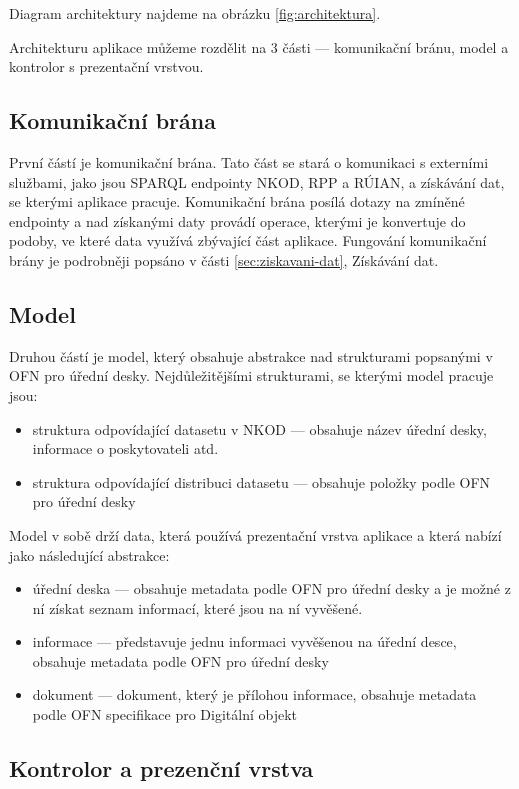 Diagram architektury najdeme na obrázku \ref{fig:architektura}.

Architekturu aplikace můžeme rozdělit na 3 části --- komunikační bránu, model a kontrolor s prezentační vrstvou.

\subsection{Komunikační brána}

První částí je komunikační brána. Tato část se stará o komunikaci s externími službami, jako jsou SPARQL endpointy NKOD, RPP a RÚIAN, a získávání dat, se kterými aplikace pracuje. Komunikační brána posílá dotazy na zmíněné endpointy a nad získanými daty provádí operace, kterými je konvertuje do podoby, ve které data využívá zbývající část aplikace. Fungování komunikační brány je podrobněji popsáno v části \ref{sec:ziskavani-dat}, Získávání dat.

\subsection{Model}

Druhou částí je model, který obsahuje abstrakce nad strukturami popsanými v OFN pro úřední desky. Nejdůležitějšími strukturami, se kterými model pracuje jsou:
\begin{itemize}
    \item struktura odpovídající datasetu v NKOD --- obsahuje název úřední desky, informace o poskytovateli atd.
    \item struktura odpovídající distribuci datasetu --- obsahuje položky podle OFN pro úřední desky
\end{itemize}

Model v sobě drží data, která používá prezentační vrstva aplikace a která nabízí jako následující abstrakce:
\begin{itemize}
    \item úřední deska --- obsahuje metadata podle OFN pro úřední desky a je možné z ní získat seznam informací, které jsou na ní vyvěšené.
    \item informace --- představuje jednu informaci vyvěšenou na úřední desce, obsahuje metadata podle OFN pro úřední desky
    \item dokument --- dokument, který je přílohou informace, obsahuje metadata podle OFN specifikace pro Digitální objekt \cite{OFN-Dig}
\end{itemize}

\subsection{Kontrolor a prezenční vrstva}

